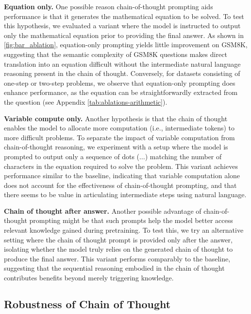 \textbf{Equation only.} One possible reason chain-of-thought prompting aids performance is that it generates the mathematical equation to be solved. To test this hypothesis, we evaluated a variant where the model is instructed to output only the mathematical equation prior to providing the final answer. 
As shown in \cref{fig:bar_ablation}, equation-only prompting yields little improvement on GSM8K, suggesting that the semantic complexity of GSM8K questions makes direct translation into an equation difficult without the intermediate natural language reasoning present in the chain of thought. Conversely, for datasets consisting of one-step or two-step problems, we observe that equation-only prompting does enhance performance, as the equation can be straightforwardly extracted from the question (see Appendix \cref{tab:ablations-arithmetic}).


\textbf{Variable compute only.} Another hypothesis is that the chain of thought enables the model to allocate more computation (i.e., intermediate tokens) to more difficult problems. To separate the impact of variable computation from chain-of-thought reasoning, we experiment with a setup where the model is prompted to output only a sequence of dots ($\ldots$) matching the number of characters in the equation required to solve the problem. This variant achieves performance similar to the baseline, indicating that variable computation alone does not account for the effectiveness of chain-of-thought prompting, and that there seems to be value in articulating intermediate steps using natural language.

\textbf{Chain of thought after answer.} Another possible advantage of chain-of-thought prompting might be that such prompts help the model better access relevant knowledge gained during pretraining. To test this, we try an alternative setting where the chain of thought prompt is provided only after the answer, isolating whether the model truly relies on the generated chain of thought to produce the final answer. This variant performs comparably to the baseline, suggesting that the sequential reasoning embodied in the chain of thought contributes benefits beyond merely triggering knowledge.


\subsection{Robustness of Chain of Thought}\label{subsec:robustness}

